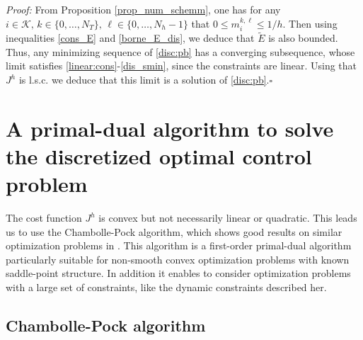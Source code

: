 \documentclass[conference]{IEEEtran}
\begin{document}
\textit{Proof: }From Proposition \ref{prop_num_schemm}, one has for any $i\in \mathcal{K},\,k\in \{0,\ldots, N_T\},\,\ell \in \{0,\ldots, N_h-1\}$ that $0\leq m_i^{k,\ell }\leq 1/h$. Then using inequalities \eqref{cons_E} and \eqref{borne_E_dis}, we deduce that $\tilde{E}$ is also bounded. Thus, any minimizing sequence of \eqref{disc:pb} has a converging subsequence, whose limit satisfies \eqref{linear:cons}-\eqref{dis_smin}, since the constraints are linear. Using that $J^h$ is l.s.c. we deduce that this limit is a solution of \eqref{disc:pb}.\hfill{$\square$}

\section{A primal-dual algorithm to solve the discretized optimal control problem}\label{cp_section}

The cost function $J^h$ is convex but not necessarily linear or quadratic.  This leads us to use the Chambolle-Pock algorithm, which shows good results on similar optimization problems in \cite{briceno2018proximal}. This algorithm  is a first-order primal-dual algorithm particularly suitable for non-smooth convex optimization problems with known saddle-point structure. In addition it enables to consider optimization problems with a large set of constraints, like the dynamic constraints described her.

\subsection{Chambolle-Pock algorithm}
\end{document}
